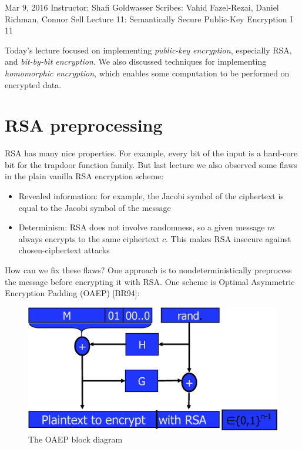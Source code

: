 \documentclass[10pt]{article}
\newcommand{\scribes}{Vahid Fazel-Rezai, Daniel Richman, Connor Sell}
\newcommand{\lecnumber}{11}
\newcommand{\lectitle}{Semantically Secure Public-Key Encryption I
}
\newcommand{\thedate}{Mar 9, 2016}
\begin{document}


{\thedate}
{Instructor: Shafi Goldwasser}
{Scribes: \scribes}
{Lecture \lecnumber: \lectitle}
{\lecnumber}


Today's lecture focused on implementing \textit{public-key encryption}, especially RSA, and \textit{bit-by-bit encryption}. We also discussed techniques for implementing \textit{homomorphic encryption}, which enables some computation to be performed on encrypted data. 

\section{RSA preprocessing}

RSA has many nice properties. For example, every bit of the input is a hard-core bit for the trapdoor function family. But last lecture we also observed some flaws in the plain vanilla RSA encryption scheme:
\begin{itemize}
  \item Revealed information: for example, the Jacobi symbol of the ciphertext is equal to the Jacobi symbol of the message
  \item Determinism: RSA does not involve randomness, so a given message $m$ always encrypts to the same ciphertext $c$. This makes RSA insecure against chosen-ciphertext attacks
\end{itemize}

How can we fix these flaws? One approach is to nondeterministically preprocess the message before encrypting it with RSA. One scheme is Optimal Asymmetric Encryption Padding (OAEP) [BR94]:

\begin{figure}['h']
\includegraphics{oaep}
\caption{The OAEP block diagram}
\end{figure}
\end{document}
